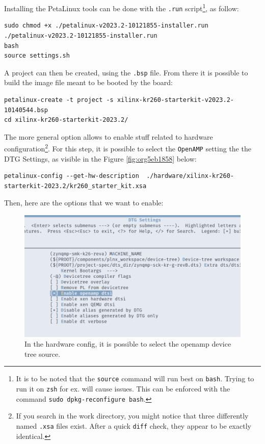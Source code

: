 \documentclass[10pt]{article}
\begin{document}
Installing the PetaLinux tools can be done with the \texttt{.run} script\footnote{It is to be noted that the \texttt{source} command will run best on \texttt{bash}. Trying
to run it on \texttt{zsh} for ex. will cause issues. This can be enforced with the
command \texttt{sudo dpkg-reconfigure bash}.\label{orgf1ef13d}}, as follow:
\begin{verbatim}
sudo chmod +x ./petalinux-v2023.2-10121855-installer.run
./petalinux-v2023.2-10121855-installer.run
bash
source settings.sh
\end{verbatim}

A project can then be created, using the \texttt{.bsp} file. From there it is possible to
build the image file meant to be booted by the board:
\begin{verbatim}
petalinux-create -t project -s xilinx-kr260-starterkit-v2023.2-10140544.bsp
cd xilinx-kr260-starterkit-2023.2/
\end{verbatim}


The more general option allows to enable stuff related to hardware
configuration\footnote{If you search in the work directory, you might notice that three
differently named \texttt{.xsa} files exist. After a quick \texttt{diff} check, they appear to be
exactly identical.\label{orgd8cfba5}}. For this step, it is possible to select the \texttt{OpenAMP}
setting the the DTG Settings, as visible in the Figure \ref{fig:org5eb1858} below:
\begin{verbatim}
petalinux-config --get-hw-description  ./hardware/xilinx-kr260-starterkit-2023.2/kr260_starter_kit.xsa
\end{verbatim}

Then, here are the options that we want to enable:
\begin{figure}[htbp]
\centering
\includegraphics[width=.6\textwidth]{./img/yocto_openamp_dtg.png}
\caption{\label{fig:orgcddc082}In the hardware config, it is possible to select the openamp device tree source.}
\end{figure}
\end{document}
